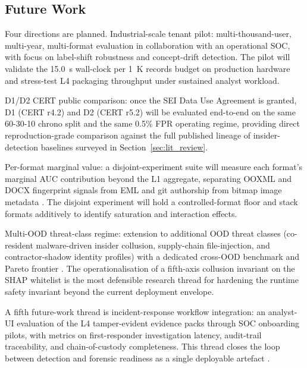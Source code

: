 \subsection{Future Work}

Four directions are planned. Industrial-scale tenant pilot: multi-thousand-user, multi-year, multi-format evaluation in collaboration with an operational SOC, with focus on label-shift robustness and concept-drift detection. The pilot will validate the 15.0~s wall-clock per 1~K records budget on production hardware and stress-test L4 packaging throughput under sustained analyst workload.

D1/D2 CERT public comparison: once the SEI Data Use Agreement is granted, D1 (CERT r4.2) and D2 (CERT r5.2) will be evaluated end-to-end on the same 60-30-10 chrono split and the same 0.5\% FPR operating regime, providing direct reproduction-grade comparison against the full published lineage of insider-detection baselines surveyed in Section~\ref{sec:lit_review}.

Per-format marginal value: a disjoint-experiment suite will measure each format's marginal AUC contribution beyond the L1 aggregate, separating OOXML and DOCX fingerprint signals from EML and git authorship from bitmap image metadata \citep{didriksen2014ooxml, fu2015docx, umair2024exif2vec, yasenenko2025evaluating}. The disjoint experiment will hold a controlled-format floor and stack formats additively to identify saturation and interaction effects.

Multi-OOD threat-class regime: extension to additional OOD threat classes (co-resident malware-driven insider collusion, supply-chain file-injection, and contractor-shadow identity profiles) with a dedicated cross-OOD benchmark and Pareto frontier \citep{li2021threat, mavroeidis2018framework, shoderu2025dfrsaas}. The operationalisation of a fifth-axis collusion invariant on the SHAP whitelist is the most defensible research thread for hardening the runtime safety invariant beyond the current deployment envelope.

A fifth future-work thread is incident-response workflow integration: an analyst-UI evaluation of the L4 tamper-evident evidence packs through SOC onboarding pilots, with metrics on first-responder investigation latency, audit-trail traceability, and chain-of-custody completeness. This thread closes the loop between detection and forensic readiness as a single deployable artefact \citep{aki2025provenance, shoderu2025dfrsaas, shoderu2026dfrconference, yusof2025provcon}.

